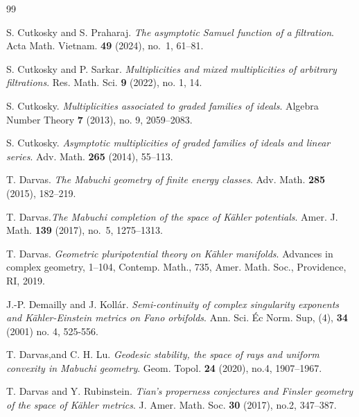 \documentclass[11pt, leqno]{amsart}%
\theoremstyle{plain}
\theoremstyle{definition}
\theoremstyle{remark}
\numberwithin{equation}{section}
\begin{document}
\begin{thebibliography}{99}
	
	
     S. Cutkosky and S. Praharaj. \emph{The asymptotic Samuel function of a filtration}. 
    Acta Math. Vietnam. {\bf 49} (2024), no.~1, 61--81.

     S. Cutkosky and P. Sarkar. \emph{Multiplicities and mixed multiplicities of arbitrary filtrations}.
    Res. Math. Sci.  \textbf{9}  (2022),  no. 1, 14.
	
     S. Cutkosky. \emph{Multiplicities associated to graded families of ideals}.
    Algebra Number Theory  \textbf{7} (2013),  no. 9, 2059--2083.
	
     S. Cutkosky. \emph{Asymptotic multiplicities of graded families of ideals and linear series}.
    Adv. Math. \textbf{265} (2014), 55--113. 
	
     T. Darvas. \emph{The Mabuchi geometry of finite energy classes}.
    Adv. Math. \textbf{285} (2015), 182–219.

     T. Darvas.\emph{The Mabuchi completion of the space of K\"ahler potentials}.
    Amer. J. Math. {\bf 139} (2017), no.~5, 1275--1313.
    
     T. Darvas. \emph{Geometric pluripotential theory on K\"ahler manifolds}.
    Advances in complex geometry, 1--104, Contemp. Math., 735, Amer. Math. Soc., Providence, RI, 2019. 
	
     J.-P. Demailly and J. Koll\'ar. \emph{Semi-continuity of complex singularity exponents and K\"ahler-Einstein metrics on Fano orbifolds}. 
    Ann. Sci. \'Ec Norm. Sup, (4), \textbf{34} (2001) no. 4, 525-556.
	
     T. Darvas,and C. H. Lu. \emph{Geodesic stability, the space of rays and uniform convexity in Mabuchi geometry}.
    Geom. Topol. \textbf{24} (2020), no.4, 1907–1967.
	
	
	
	
     T. Darvas and Y. Rubinstein. \emph{Tian's properness conjectures and Finsler geometry of the space of Kähler metrics}. 
    J. Amer. Math. Soc. \textbf{30} (2017), no.2, 347–387.
	

\end{thebibliography}
\end{document}
